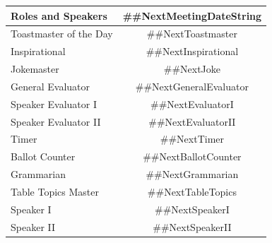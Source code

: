 \documentclass{article}
\newcommand{\nextMeetingDateString}{##NextMeetingDateString}
\newcommand{\nextToastmaster}{##NextToastmaster}
\newcommand{\nextTableTopics}{##NextTableTopics}
\newcommand{\nextGeneralEvaluator}{##NextGeneralEvaluator}
\newcommand{\nextEvaluatorI}{##NextEvaluatorI}
\newcommand{\nextEvaluatorII}{##NextEvaluatorII}
\newcommand{\nextSpeakerI}{##NextSpeakerI}
\newcommand{\nextSpeakerII}{##NextSpeakerII}
\newcommand{\nextGrammarian}{##NextGrammarian}
\newcommand{\nextTimer}{##NextTimer}
\newcommand{\nextInspirational}{##NextInspirational}
\newcommand{\nextBallotCounter}{##NextBallotCounter}
\newcommand{\nextJoke}{##NextJoke}
\begin{document}
  \begin{tabular}{ |l|c| }
    \hline
    Roles and Speakers & \nextMeetingDateString{} \\
    \hline
    Toastmaster of the Day & \nextToastmaster{} \\
    \hline
    Inspirational & \nextInspirational{} \\
    \hline
    Jokemaster & \nextJoke{} \\
    \hline
    General Evaluator & \nextGeneralEvaluator{} \\
    \hline
    Speaker Evaluator I & \nextEvaluatorI{} \\
    \hline
    Speaker Evaluator II & \nextEvaluatorII{} \\
    \hline
    Timer & \nextTimer{} \\
    \hline
    Ballot Counter & \nextBallotCounter{} \\
    \hline
    Grammarian & \nextGrammarian{} \\
    \hline
    Table Topics Master & \nextTableTopics{} \\
    \hline\hline
    Speaker I & \nextSpeakerI{} \\
    \hline
    Speaker II & \nextSpeakerII{} \\
    \hline
  \end{tabular}
\end{document}
